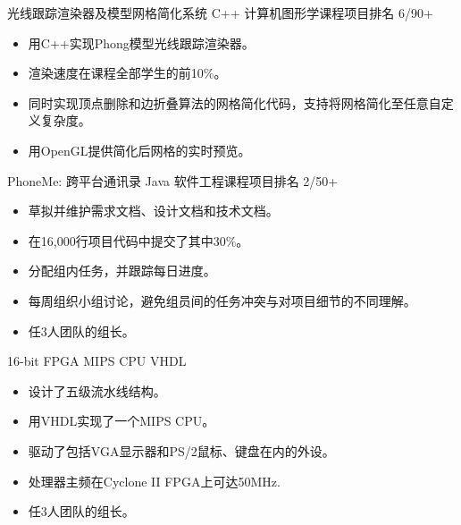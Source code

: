 \documentclass[11pt,a4paper]{moderncv/moderncv}
\begin{document}
{光线跟踪渲染器及模型网格简化系统}
{C++}
{计算机图形学课程项目}{排名 6/90+}
{
\begin{itemize}
	\item 用C++实现Phong模型光线跟踪渲染器。
	\item 渲染速度在课程全部学生的前10\%。
	\item 同时实现顶点删除和边折叠算法的网格简化代码，支持将网格简化至任意自定义复杂度。
	\item 用OpenGL提供简化后网格的实时预览。
\end{itemize}
}

{PhoneMe: 跨平台通讯录}
{Java}
{软件工程课程项目}{排名 2/50+}
{
\begin{itemize}
	\item 草拟并维护需求文档、设计文档和技术文档。
	\item 在16,000行项目代码中提交了其中30\%。
	\item 分配组内任务，并跟踪每日进度。
	\item 每周组织小组讨论，避免组员间的任务冲突与对项目细节的不同理解。
	\item 任3人团队的组长。
\end{itemize}
}


{16-bit FPGA MIPS CPU}
{VHDL}
{}{}
{
\begin{itemize}
	\item 设计了五级流水线结构。
	\item 用VHDL实现了一个MIPS CPU。
	\item 驱动了包括VGA显示器和PS/2鼠标、键盘在内的外设。
	\item 处理器主频在Cyclone II FPGA上可达50MHz.
	\item 任3人团队的组长。	
\end{itemize}
}




\nocite{*}
\renewcommand{\refname}{发表论文}

\end{document}
